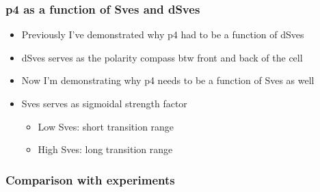 




\iffalse
\plotslide{Constant p4}{constant_p4_func.pdf}
\plotslide{Constant p4}{p4a_sign_change_Sves.pdf}
\plotslide{Constant p4}{p4a_sign_change_MI.pdf}

\begin{frame}
  \frametitle{Constant p4}
  \begin{itemize}
    \item Positive amp is good for native
    \item Negative amp is good for overexpressed
    \item Smoothly change amp w.r.t expression level
  \end{itemize}
\end{frame}

\plotslide{Coupled p4}{coupled_p4_func.pdf}
\plotslide{Coupled p4}{Sves_coupled_p4.pdf}
\plotslide{Coupled p4}{MI_coupled_p4.pdf}

\fi





\begin{frame}
  \frametitle{p4 as a function of Sves and dSves}
  \begin{itemize}
    \itemsep3em
    \item Previously I've demonstrated why p4 had to be a function of dSves
    \item dSves serves as the polarity compass btw front and back of the cell
    \item Now I'm demonstrating why p4 needs to be a function of Sves as
      well
    \item Sves serves as sigmoidal strength factor
      \begin{itemize}
          \item Low Sves: short transition range
          \item High Sves: long transition range
      \end{itemize}
  \end{itemize}
\end{frame}

\begin{frame}
  \frametitle{Comparison with experiments}
\end{frame}

